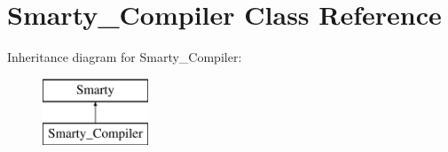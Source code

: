 \hypertarget{class_smarty___compiler}{\section{\-Smarty\-\_\-\-Compiler \-Class \-Reference}
\label{class_smarty___compiler}
}
\-Inheritance diagram for \-Smarty\-\_\-\-Compiler\-:\begin{figure}[H]
\begin{center}
\leavevmode
\includegraphics[height=2.000000cm]{class_smarty___compiler}
\end{center}
\end{figure}
